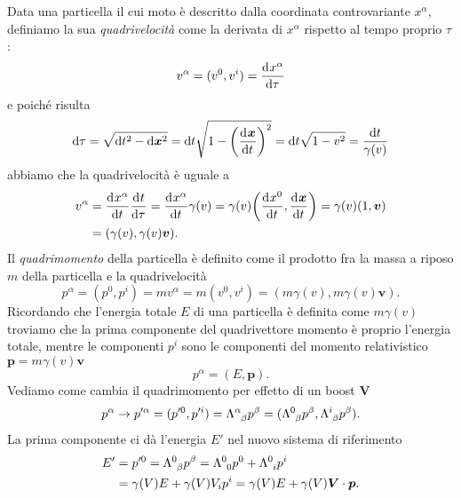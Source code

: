 Data una particella il cui moto è descritto dalla coordinata controvariante
$x^{\alpha}$, definiamo la sua \emph{quadrivelocità} come
la derivata di $x^{\alpha}$ rispetto al tempo proprio $\tau$:
\begin{equation}
  v^{\alpha} = (v^{0}, v^{i}) =\frac{{\mathop{}\!\mathrm{d}^{}}x^{\alpha}}{\mathop{}\!\mathrm{d} {\tau}^{}}
\end{equation}
e poiché risulta
\begin{equation}
  \dd \tau = \sqrt{\dd t^{2} - \dd \bm{x}^{2}} = \dd t \sqrt{1 -
    \bigg(\toder{\bm{x}}{t}\bigg)^{2}} = \dd t\sqrt{1 - v^{2}} = \frac{\dd
    t}{\gamma(v)}
\end{equation}
abbiamo che la quadrivelocità è uguale a
\begin{equation}
  \begin{split}
    v^{\alpha} &= \toder{x^{\alpha}}{t}\toder{t}{\tau} = \toder{x^{\alpha}}{t}
    \gamma(v) = \gamma(v) \bigg(\toder{x^{0}}{t}, \toder{\bm{x}}{t}\bigg) =
    \gamma(v)(1,\bm{v}) \\
    &= (\gamma(v), \gamma(v)\bm{v}).
  \end{split}
\end{equation}
Il \emph{quadrimomento} della particella è definito come il
prodotto fra la massa a riposo $m$ della particella e la quadrivelocità
\begin{equation}
  p^{\alpha} = (p^{0},p^{i}) = m v^{\alpha} = m (v^{0}, v^{i}) = (m\gamma(v),
  m\gamma(v)\bm{v}).
\end{equation}
Ricordando che l'energia totale $E$ di una particella è definita come
$m\gamma(v)$ troviamo che la prima componente del quadrivettore momento è
proprio l'energia totale, mentre le componenti $p^{i}$ sono le componenti del
momento relativistico $\bm{p} = m\gamma(v)\bm{v}$
\begin{equation}
  p^{\alpha} = (E, \bm{p}).
\end{equation}
Vediamo come cambia il quadrimomento per effetto di un boost $\bm{V}$
\begin{equation}
  p^{\alpha} \to p'^{\alpha} = (p'^{0}, p'^{i}) =
  \tensor{\Lambda}{^{\alpha}_{\beta}} p^{\beta} =
  (\tensor{\Lambda}{^{0}_{\beta}}p^{\beta},
  \tensor{\Lambda}{^{i}_{\beta}}p^{\beta}).
\end{equation}
La prima componente ci dà l'energia $E'$ nel nuovo sistema di riferimento
\begin{equation}
  \begin{split}
    E' &= p'^{0} = \tensor{\Lambda}{^{0}_{\beta}}p^{\beta} =
    \tensor{\Lambda}{^{0}_{0}}p^{0} + \tensor{\Lambda}{^{0}_{i}}p^{i} \\
    &= \gamma(V) E + \gamma(V) V_{i}p^{i} = \gamma(V) E + \gamma(V)
    \bm{V}\cdot\bm{p}.
  \end{split}
\end{equation}
